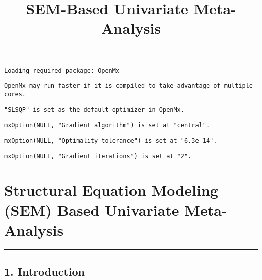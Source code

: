 \documentclass[
  letterpaper,
  DIV=11,
  numbers=noendperiod]{scrartcl}
\title{SEM-Based Univariate Meta-Analysis}
\author{}
\date{}
\begin{document}
\maketitle


\begin{verbatim}
Loading required package: OpenMx
\end{verbatim}

\begin{verbatim}
OpenMx may run faster if it is compiled to take advantage of multiple cores.
\end{verbatim}

\begin{verbatim}
"SLSQP" is set as the default optimizer in OpenMx.
\end{verbatim}

\begin{verbatim}
mxOption(NULL, "Gradient algorithm") is set at "central".
\end{verbatim}

\begin{verbatim}
mxOption(NULL, "Optimality tolerance") is set at "6.3e-14".
\end{verbatim}

\begin{verbatim}
mxOption(NULL, "Gradient iterations") is set at "2".
\end{verbatim}

\section{Structural Equation Modeling (SEM) Based Univariate
Meta-Analysis}\label{structural-equation-modeling-sem-based-univariate-meta-analysis}

\begin{center}\rule{0.5\linewidth}{0.5pt}\end{center}

\subsection*{\texorpdfstring{1.
\textbf{Introduction}}{1. Introduction}}\label{introduction}
\end{document}
